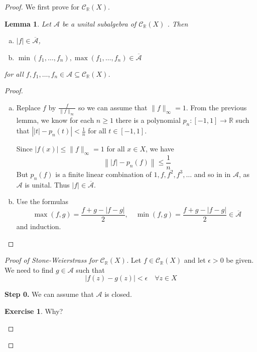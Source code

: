 \documentclass[10pt, oneside, reqno]{amsart}
\theoremstyle{plain}%
\newtheorem{lem}[thm]{Lemma}
\theoremstyle{definition}
\newtheorem{exer}[thm]{Exercise}
\theoremstyle{remark}
\newcommand{\R}{\mathbb{R}}
\begin{document}
\begin{proof}
    We first prove for $\mathcal{C}_\R(X)$. 
    
    \begin{lem}
        Let $\mathcal{A}$ be a unital subalgebra of $\mathcal{C}_\R(X)$ . Then \begin{enumerate}[(a)]
            \item $|f| \in \overline{\mathcal{A}}$,
            \item $\min(f_1, \dots, f_n), \max(f_1, \dots, f_n) \in \overline{\mathcal{A}}$ 
        \end{enumerate} for all $f, f_1, \dots, f_n \in \mathcal{A} \subseteq \mathcal{C}_\R(X)$. 
    \end{lem}
    \begin{proof}
        \begin{enumerate}[(a)]
            \item Replace $f$ by $\frac{f}{\| f \|_\infty}$ so we can assume that $\|f \|_\infty = 1$.  From the previous lemma, we know for each $n \geq 1$ there is a polynomial $p_n: [-1,1] \rightarrow \R$  such that $\left| |t| - p_n(t) \right| < \frac{1}{n}$ for all $t \in [-1,1]$. 
            
            Since $|f(x)| \leq \|f \|_\infty = 1$ for all $x \in X$, we have \[
                \left\| |f| - p_n(f) \right\| \leq \frac{1}{n}
            \] But $p_n(f)$ is a finite linear combination of $1, f, f^2, f^3, \dots$ and so in in $\mathcal{A}$, as $\mathcal{A}$ is unital.  Thus $|f| \in \overline{\mathcal{A}}$.  
            \item Use the formulas \[
                \max(f,g) = \frac{f+g - |f-g|}{2}, \quad \min(f,g) = \frac{f + g - |f-g|}{2} \in \overline{\mathcal{A}}
            \] and induction.  
        \end{enumerate}
    \end{proof}
    
    \begin{proof}[Proof of Stone-Weierstrass for $\mathcal{C}_\R(X)$]
        Let $f \in \mathcal{C}_\R(X)$ and let $\epsilon > 0$ be given.  We need to find $g \in \mathcal{A}$ such that \[
            |f(z) - g(z) | < \epsilon \quad \forall z \in X 
        \]
        
        \textbf{Step 0.}  We can assume that $\mathcal{A}$ is closed.  
        \begin{exer}
            Why?
        \end{exer} 
        

\end{proof}
\end{proof}
\end{document}
